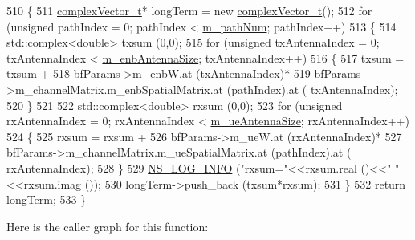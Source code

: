 \begin{DoxyCode}
510 \{
511         \hyperlink{namespacens3_a6a7f75817ae50e6ac47414955b17d926}{complexVector\_t}* longTerm = \textcolor{keyword}{new} \hyperlink{namespacens3_a6a7f75817ae50e6ac47414955b17d926}{complexVector\_t}();
512         \textcolor{keywordflow}{for} (\textcolor{keywordtype}{unsigned} pathIndex = 0; pathIndex < \hyperlink{classns3_1_1MmWaveBeamforming_a4aeb1eea76b6ba2be91c411494b4c573}{m\_pathNum}; pathIndex++)
513         \{
514                 std::complex<double> txsum (0,0);
515                 \textcolor{keywordflow}{for} (\textcolor{keywordtype}{unsigned} txAntennaIndex = 0; txAntennaIndex < 
      \hyperlink{classns3_1_1MmWaveBeamforming_afd76d851ee841afc56c0f8b7563e2bbc}{m\_enbAntennaSize}; txAntennaIndex++)
516                 \{
517                         txsum = txsum +
518                                         bfParams->m\_enbW.at (txAntennaIndex)*
519                                         bfParams->m\_channelMatrix.m\_enbSpatialMatrix.at (pathIndex).at (
      txAntennaIndex);
520                 \}
521 
522                 std::complex<double> rxsum (0,0);
523                 \textcolor{keywordflow}{for} (\textcolor{keywordtype}{unsigned} rxAntennaIndex = 0; rxAntennaIndex < 
      \hyperlink{classns3_1_1MmWaveBeamforming_a1debaf83bab520b89e80f333841dfe93}{m\_ueAntennaSize}; rxAntennaIndex++)
524                 \{
525                         rxsum = rxsum +
526                                         bfParams->m\_ueW.at (rxAntennaIndex)*
527                                         bfParams->m\_channelMatrix.m\_ueSpatialMatrix.at (pathIndex).at (
      rxAntennaIndex);
528                 \}
529                 \hyperlink{group__logging_gafbd73ee2cf9f26b319f49086d8e860fb}{NS\_LOG\_INFO} (\textcolor{stringliteral}{"rxsum="}<<rxsum.real ()<<\textcolor{stringliteral}{" "}<<rxsum.imag ());
530                 longTerm->push\_back (txsum*rxsum);
531         \}
532         \textcolor{keywordflow}{return} longTerm;
533 \}
\end{DoxyCode}


Here is the caller graph for this function\+:


